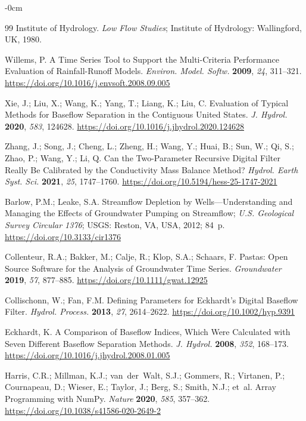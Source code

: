 \documentclass[hydrology,article,submit,pdftex,moreauthors]{Definitions/mdpi}
\begin{document}
\begin{adjustwidth}{-\extralength}{0cm}
\begin{thebibliography}{99}
Institute of Hydrology. \textit{Low Flow Studies}; Institute of Hydrology: Wallingford, UK, 1980.

Willems, P. A Time Series Tool to Support the Multi-Criteria Performance Evaluation of Rainfall-Runoff Models. \textit{Environ. Model. Softw.} \textbf{2009}, \textit{24}, 311--321. \url{https://doi.org/10.1016/j.envsoft.2008.09.005}

Xie, J.; Liu, X.; Wang, K.; Yang, T.; Liang, K.; Liu, C. Evaluation of Typical Methods for Baseflow Separation in the Contiguous United States. \textit{J. Hydrol.} \textbf{2020}, \textit{583}, 124628. \url{https://doi.org/10.1016/j.jhydrol.2020.124628}

Zhang, J.; Song, J.; Cheng, L.; Zheng, H.; Wang, Y.; Huai, B.; Sun, W.; Qi, S.; Zhao, P.; Wang, Y.; Li, Q. Can the Two-Parameter Recursive Digital Filter Really Be Calibrated by the Conductivity Mass Balance Method? \textit{Hydrol. Earth Syst. Sci.} \textbf{2021}, \textit{25}, 1747--1760. \url{https://doi.org/10.5194/hess-25-1747-2021}


Barlow, P.M.; Leake, S.A. Streamflow Depletion by Wells---Understanding and Managing the Effects of Groundwater Pumping on Streamflow; \textit{U.S. Geological Survey Circular 1376}; USGS: Reston, VA, USA, 2012; 84~p. \url{https://doi.org/10.3133/cir1376}

Collenteur, R.A.; Bakker, M.; Calje, R.; Klop, S.A.; Schaars, F. Pastas: Open Source Software for the Analysis of Groundwater Time Series. \textit{Groundwater} \textbf{2019}, \textit{57}, 877--885. \url{https://doi.org/10.1111/gwat.12925}

Collischonn, W.; Fan, F.M. Defining Parameters for Eckhardt's Digital Baseflow Filter. \textit{Hydrol. Process.} \textbf{2013}, \textit{27}, 2614--2622. \url{https://doi.org/10.1002/hyp.9391}

Eckhardt, K. A Comparison of Baseflow Indices, Which Were Calculated with Seven Different Baseflow Separation Methods. \textit{J. Hydrol.} \textbf{2008}, \textit{352}, 168--173. \url{https://doi.org/10.1016/j.jhydrol.2008.01.005}

Harris, C.R.; Millman, K.J.; van~der~Walt, S.J.; Gommers, R.; Virtanen, P.; Cournapeau, D.; Wieser, E.; Taylor, J.; Berg, S.; Smith, N.J.; et~al. Array Programming with NumPy. \textit{Nature} \textbf{2020}, \textit{585}, 357--362. \url{https://doi.org/10.1038/s41586-020-2649-2}


\end{thebibliography}
\end{adjustwidth}
\end{document}
